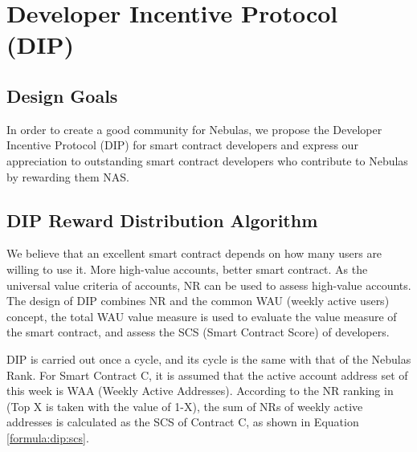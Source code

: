 \section{Developer Incentive Protocol (DIP)}
\label{sec:dip}

\subsection{Design Goals}
\label{dip:design}

In order to create a good community for Nebulas, we propose the Developer Incentive Protocol (DIP) for smart contract developers and express our appreciation to outstanding smart contract developers who contribute to Nebulas by rewarding them NAS. 


\subsection{DIP Reward Distribution Algorithm}
\label{dip:arith}

We believe that an excellent smart contract depends on how many users are willing to use it. More high-value accounts, better smart contract. As the universal value criteria of accounts, NR can be used to assess high-value accounts. The design of DIP combines NR and the common WAU (weekly active users) concept, the total WAU value measure is used to evaluate the value measure of the smart contract, and assess the SCS (Smart Contract Score) of developers. 


DIP is carried out once a cycle, and its cycle is the same with that of the Nebulas Rank. For Smart Contract C, it is assumed that the active account address set of this week is WAA (Weekly Active Addresses). According to the NR ranking in  (Top X is taken with the value of 1-X), the sum of NRs of weekly active addresses is calculated as the SCS of Contract C, as shown in Equation \ref{formula:dip:scs}. 

